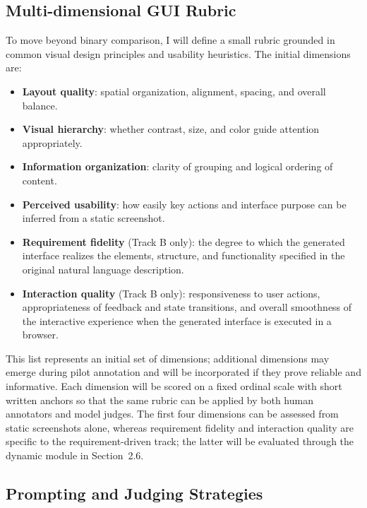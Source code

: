 \documentclass[pdflatex,sn-mathphys-num]{sn-jnl}
\begin{document}
\subsection{Multi-dimensional GUI Rubric}

To move beyond binary comparison, I will define a small rubric grounded in common
visual design principles and usability heuristics. The initial dimensions are:

\begin{itemize}
    \item \textbf{Layout quality}: spatial organization, alignment, spacing, and
    overall balance.
    \item \textbf{Visual hierarchy}: whether contrast, size, and color guide attention
    appropriately.
    \item \textbf{Information organization}: clarity of grouping and logical ordering
    of content.
    \item \textbf{Perceived usability}: how easily key actions and interface purpose
    can be inferred from a static screenshot.
    \item \textbf{Requirement fidelity} (Track B only): the degree to which the
    generated interface realizes the elements, structure, and functionality specified
    in the original natural language description.
    \item \textbf{Interaction quality} (Track B only): responsiveness to user actions,
    appropriateness of feedback and state transitions, and overall smoothness of the
    interactive experience when the generated interface is executed in a browser.
\end{itemize}

This list represents an initial set of dimensions; additional dimensions may emerge
during pilot annotation and will be incorporated if they prove reliable and
informative. Each dimension will be scored on a fixed ordinal scale with short written
anchors so that the same rubric can be applied by both human annotators and model
judges. The first four dimensions can be assessed from static screenshots alone,
whereas requirement fidelity and interaction quality are specific to the
requirement-driven track; the latter will be evaluated through the dynamic module in
Section~2.6.

\subsection{Prompting and Judging Strategies}
\end{document}
